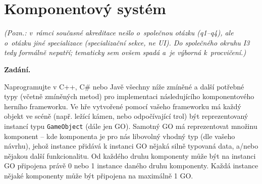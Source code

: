 \section{Komponentový systém}

\noindent\textit{(Pozn.: v~rámci současné akreditace nešlo o~společnou otázku (q1--q4), ale o~otázku jiné specializace (specializační sekce, ne UI). Do společného okruhu I3 tedy formálně nepatří; tematicky sem ovšem spadá a~je výborná k~procvičení.)}\par

\noindent\textbf{Zadání.}\par
Naprogramujte v C++, C\# nebo Javě všechny níže zmíněné a další potřebné typy (včetně
zmíněných metod) pro implementaci následujícího komponentového herního frameworku.
Ve hře vytvořené pomocí vašeho frameworku má každý objekt ve scéně (např. ležící kámen,
nebo odpočívající trol) být reprezentovaný instancí typu \texttt{GameObject} (dále jen
GO). Samotný GO má reprezentovat množinu komponent -- kde komponenta je pro nás
libovolný vhodný typ (dle vašeho návrhu), jehož instance přidává k instanci GO nějaká
silně typovaná data, a/nebo nějakou další funkcionalitu. Od každého druhu komponenty
může být na instanci GO připojena právě 0 nebo 1 instance daného druhu komponenty.
Každá instance nějaké komponenty může být připojena na maximálně 1 GO.

